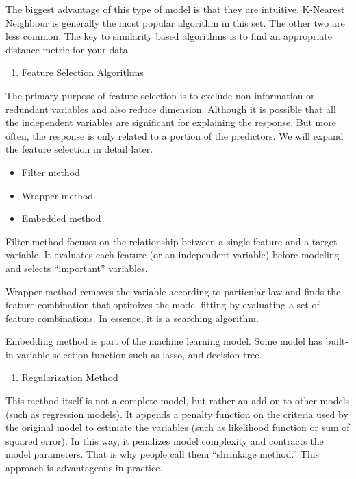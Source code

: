 \documentclass[12pt,]{krantz}
\providecommand{\tightlist}{%
  \setlength{\itemsep}{0pt}\setlength{\parskip}{0pt}}
\theoremstyle{definition}
\theoremstyle{definition}
\theoremstyle{remark}
\begin{document}
The biggest advantage of this type of model is that they are intuitive.
K-Nearest Neighbour is generally the most popular algorithm in this set.
The other two are less common. The key to similarity based algorithms is
to find an appropriate distance metric for your data.

\begin{enumerate}
\def\labelenumi{\arabic{enumi}.}
\setcounter{enumi}{2}
\tightlist
\item
  Feature Selection Algorithms
\end{enumerate}

The primary purpose of feature selection is to exclude non-information
or redundant variables and also reduce dimension. Although it is
possible that all the independent variables are significant for
explaining the response. But more often, the response is only related to
a portion of the predictors. We will expand the feature selection in
detail later.

\begin{itemize}
\tightlist
\item
  Filter method
\item
  Wrapper method
\item
  Embedded method
\end{itemize}

Filter method focuses on the relationship between a single feature and a
target variable. It evaluates each feature (or an independent variable)
before modeling and selects ``important'' variables.

Wrapper method removes the variable according to particular law and
finds the feature combination that optimizes the model fitting by
evaluating a set of feature combinations. In essence, it is a searching
algorithm.

Embedding method is part of the machine learning model. Some model has
built-in variable selection function such as lasso, and decision tree.

\begin{enumerate}
\def\labelenumi{\arabic{enumi}.}
\setcounter{enumi}{3}
\tightlist
\item
  Regularization Method
\end{enumerate}

This method itself is not a complete model, but rather an add-on to
other models (such as regression models). It appends a penalty function
on the criteria used by the original model to estimate the variables
(such as likelihood function or sum of squared error). In this way, it
penalizes model complexity and contracts the model parameters. That is
why people call them ``shrinkage method.'' This approach is advantageous
in practice.
\end{document}
